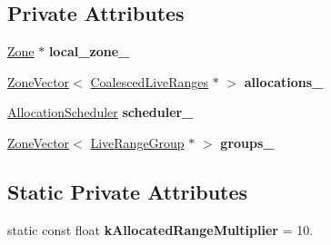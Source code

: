 \subsection*{Private Attributes}
\begin{DoxyCompactItemize}
\item 
\hyperlink{classv8_1_1internal_1_1_zone}{Zone} $\ast$ {\bfseries local\+\_\+zone\+\_\+}\hypertarget{classv8_1_1internal_1_1compiler_1_1_greedy_allocator_abd9551b4771e9e92f082d7298482b7f1}{}\label{classv8_1_1internal_1_1compiler_1_1_greedy_allocator_abd9551b4771e9e92f082d7298482b7f1}

\item 
\hyperlink{classv8_1_1internal_1_1_zone_vector}{Zone\+Vector}$<$ \hyperlink{classv8_1_1internal_1_1compiler_1_1_coalesced_live_ranges}{Coalesced\+Live\+Ranges} $\ast$ $>$ {\bfseries allocations\+\_\+}\hypertarget{classv8_1_1internal_1_1compiler_1_1_greedy_allocator_ab3abea905238a4b0300ad90da2032c56}{}\label{classv8_1_1internal_1_1compiler_1_1_greedy_allocator_ab3abea905238a4b0300ad90da2032c56}

\item 
\hyperlink{classv8_1_1internal_1_1compiler_1_1_allocation_scheduler}{Allocation\+Scheduler} {\bfseries scheduler\+\_\+}\hypertarget{classv8_1_1internal_1_1compiler_1_1_greedy_allocator_ab930bc6284c58f8de0537a157e83f7b0}{}\label{classv8_1_1internal_1_1compiler_1_1_greedy_allocator_ab930bc6284c58f8de0537a157e83f7b0}

\item 
\hyperlink{classv8_1_1internal_1_1_zone_vector}{Zone\+Vector}$<$ \hyperlink{classv8_1_1internal_1_1compiler_1_1_live_range_group}{Live\+Range\+Group} $\ast$ $>$ {\bfseries groups\+\_\+}\hypertarget{classv8_1_1internal_1_1compiler_1_1_greedy_allocator_a5517e058138c40ba11c855553a6d860b}{}\label{classv8_1_1internal_1_1compiler_1_1_greedy_allocator_a5517e058138c40ba11c855553a6d860b}

\end{DoxyCompactItemize}
\subsection*{Static Private Attributes}
\begin{DoxyCompactItemize}
\item 
static const float {\bfseries k\+Allocated\+Range\+Multiplier} = 10.\hypertarget{classv8_1_1internal_1_1compiler_1_1_greedy_allocator_a4d9f43952d5bc41dd291099c1ff6510f}{}\label{classv8_1_1internal_1_1compiler_1_1_greedy_allocator_a4d9f43952d5bc41dd291099c1ff6510f}

\end{DoxyCompactItemize}
